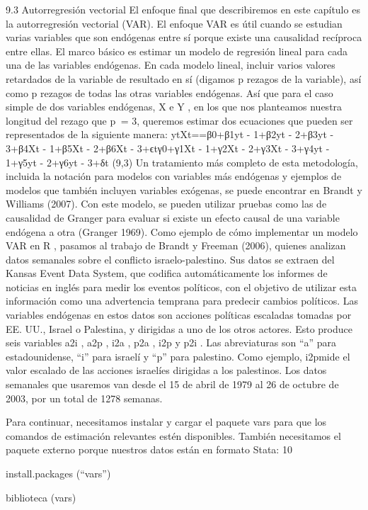 \documentclass[
]{book}
\begin{document}
9.3 Autorregresión vectorial
El enfoque final que describiremos en este capítulo es la autorregresión vectorial (VAR). El enfoque VAR es útil cuando se estudian varias variables que son endógenas entre sí porque existe una causalidad recíproca entre ellas. El marco básico es estimar un modelo de regresión lineal para cada una de las variables endógenas. En cada modelo lineal, incluir varios valores retardados de la variable de resultado en sí (digamos p rezagos de la variable), así como p rezagos de todas las otras variables endógenas. Así que para el caso simple de dos variables endógenas, X e Y , en los que nos planteamos nuestra longitud del rezago que p  = 3, queremos estimar dos ecuaciones que pueden ser representados de la siguiente manera:
ytXt==β0+β1yt - 1+β2yt - 2+β3yt - 3+β4Xt - 1+β5Xt - 2+β6Xt - 3+ϵtγ0+γ1Xt - 1+γ2Xt - 2+γ3Xt - 3+γ4yt - 1+γ5yt - 2+γ6yt - 3+δt
(9,3)
Un tratamiento más completo de esta metodología, incluida la notación para modelos con variables más endógenas y ejemplos de modelos que también incluyen variables exógenas, se puede encontrar en Brandt y Williams (2007). Con este modelo, se pueden utilizar pruebas como las de causalidad de Granger para evaluar si existe un efecto causal de una variable endógena a otra (Granger 1969).
Como ejemplo de cómo implementar un modelo VAR en R , pasamos al trabajo de Brandt y Freeman (2006), quienes analizan datos semanales sobre el conflicto israelo-palestino. Sus datos se extraen del Kansas Event Data System, que codifica automáticamente los informes de noticias en inglés para medir los eventos políticos, con el objetivo de utilizar esta información como una advertencia temprana para predecir cambios políticos. Las variables endógenas en estos datos son acciones políticas escaladas tomadas por EE. UU., Israel o Palestina, y dirigidas a uno de los otros actores. Esto produce seis variables a2i , a2p , i2a , p2a , i2p y p2i . Las abreviaturas son ``a'' para estadounidense, ``i'' para israelí y ``p'' para palestino. Como ejemplo, i2pmide el valor escalado de las acciones israelíes dirigidas a los palestinos. Los datos semanales que usaremos van desde el 15 de abril de 1979 al 26 de octubre de 2003, por un total de 1278 semanas.

Para continuar, necesitamos instalar y cargar el paquete vars para que los comandos de estimación relevantes estén disponibles. También necesitamos el paquete externo porque nuestros datos están en formato Stata: 10

install.packages (``vars'')

biblioteca (vars)
\end{document}
